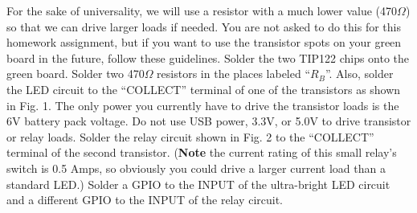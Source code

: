 \documentclass[11pt]{article}
\begin{document}
For the sake of universality, we will use a resistor with a much lower value (470$\Omega$) so that we can drive larger loads if needed. You are not asked to do this for this homework assignment, but if you want to use the transistor spots on your green board in the future, follow these guidelines. Solder the two TIP122 chips onto the green board. Solder two 470$\Omega$ resistors in the places labeled “$R_B$”. Also, solder the LED circuit to the “COLLECT” terminal of one of the transistors as shown in Fig. 1. The only power you currently have to drive the transistor loads is the 6V battery pack voltage. Do not use USB power, 3.3V, or 5.0V to drive transistor or relay loads. Solder the relay circuit shown in Fig. 2 to the “COLLECT” terminal of the second transistor. (\textbf{Note} the current rating of this small relay’s switch is 0.5 Amps, so obviously you could drive a larger current load than a standard LED.)   Solder a GPIO to the INPUT of the ultra-bright LED circuit and a different GPIO to the INPUT of the relay circuit.

\end{document}
